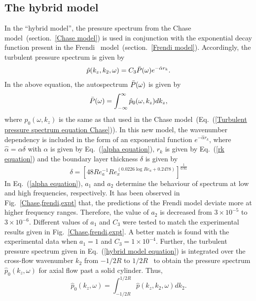 \documentclass[twocolumn,10pt]{asme2ej}
\begin{document}
\subsection{The hybrid model}
In the \enquote{hybrid model}, the pressure spectrum from the Chase~\cite{Chase1981} model~(section.~\ref{Chase model}) is used in conjunction with the exponential decay function present in the Frendi~\cite{frendi2020} model~(section.~\ref{Frendi model}). Accordingly, the turbulent pressure spectrum is given by
\begin{equation}\label{hybrid model equation}
    \hat{p}(k_{z},k_{2},\omega) = C_{3}\Bar{P}(\omega)e^{-\hat{\alpha}r_{k}}.
\end{equation}
In the above equation, the autospectrum $\Bar{P}(\omega)$ is given by
\begin{equation}\label{autospectrum equation}
    \Bar{P}(\omega) = \int^{\infty}_{-\infty}\hat{p}_{0}(\omega,k_{z})dk_{z},
\end{equation}
where $\hat{p}_{0}(\omega,k_{z})$ is the same as that used in the Chase model~(Eq.~(\ref{Turbulent pressure spectrum equation Chase})). In this new model, the wavenumber dependency is included in the form of an exponential function $e^{-\hat{\alpha}r_{k}}$, where $\hat{\alpha} = \alpha\delta$ with $\alpha$ is given by Eq.~(\ref{alpha equation}), $r_k$ is given by Eq.~(\ref{rk equation}) and the boundary layer thickness $\delta$ is given by
\begin{equation}
    \delta = [48Re_a^{-1}Re_x^{(0.0226\log{Re_a}+0.2478)}]^{\frac{1}{0.91}}
\end{equation}
In Eq.~(\ref{alpha equation}), $a_1$ and $a_2$ determine the behaviour of spectrum at low and high frequencies, respectively. It has been observed in Fig.~\ref{Chase,frendi,expt} that, the predictions of the Frendi model deviate more at higher frequency ranges. Therefore, the value of $a_2$ is decreased from $3\times10^{-5}$ to $3\times10^{-6}$. Different values of $a_1$ and $C_3$ were tested to match the experimental results given in Fig.~\ref{Chase,frendi,expt}. A better match is found with the experimental data when $a_1 = 1$ and $C_3=1\times10^{-4}$. Further, the turbulent pressure spectrum given in Eq.~(\ref{hybrid model equation}) is integrated over the cross-flow wavenumber $k_2$ from $-1/2R$ to $1/2R$~\cite{Chase1981} to obtain the pressure spectrum $\hat{p}_0(k_z,\omega)$ for axial flow past a solid cylinder. 
Thus,
\begin{equation}\label{hybrid model turbulent pressure}
    \hat{p}_0(k_{z},\omega) = \int_{-1/2R}^{1/2R}\hat{p}(k_{z},k_{2},\omega)dk_{2}.
\end{equation}
\end{document}
